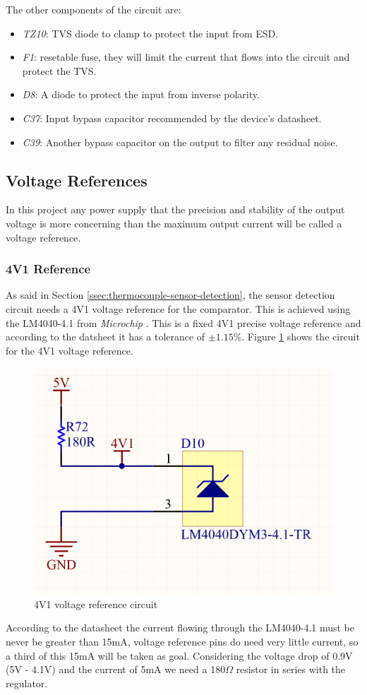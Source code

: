 			The other components of the circuit are:

			\begin{itemize}
				\item\textit{TZ10}: TVS diode to clamp to protect the input from ESD.
				\item\textit{F1}: resetable fuse, they will limit the current that flows into the circuit and protect the TVS.
				\item\textit{D8}: A diode to protect the input from inverse polarity.
				\item\textit{C37}: Input bypass capacitor recommended by the device's datasheet.
				\item\textit{C39}: Another bypass capacitor on the output to filter any residual noise.
			\end{itemize}

	\subsection{Voltage References}\label{ssec:voltage-references}

		In this project any power supply that the precision and stability of the output voltage is more concerning than the maximum output current will be called a voltage reference.

		\subsubsection{4V1 Reference}\label{sssec:4v1-reference}

			As said in Section \ref{ssec:thermocouple-sensor-detection}, the sensor detection circuit needs a 4V1 voltage reference for the comparator. This is achieved using the LM4040-4.1 from \textit{Microchip} \cite{lm4040-datasheet}. This is a fixed 4V1 precise voltage reference and according to the datsheet it has a tolerance of $\pm1.15\%$. Figure \ref{fig:4v1-voltage-ref} shows the circuit for the 4V1 voltage reference.

			\begin{figure}[htbp]
				\centering
					\includegraphics[width=.5\textwidth]{figuras/fig-4v1-voltage-ref}
				\caption{4V1 voltage reference circuit}
				\label{fig:4v1-voltage-ref}
			\end{figure}

			According to the datasheet the current flowing through the LM4040-4.1 must be never be greater than 15mA, voltage reference pins do need very little current, so a third of this 15mA will be taken as goal. Considering the voltage drop of 0.9V (5V - 4.1V) and the current of 5mA we need a 180$\Omega$ resistor in series with the regulator.